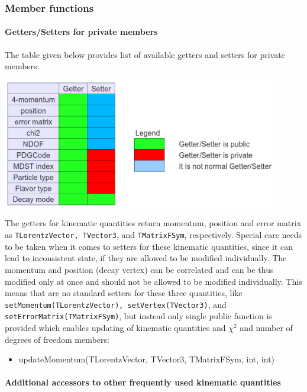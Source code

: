 \subsubsection{Member functions}

\paragraph{Getters/Setters for private members}

The table given below provides list of available getters and setters for private members:
\begin{center}
 \includegraphics[width=0.9\textwidth]{DataModel/figs/particleGetterSetter.png}
\end{center}
The getters for kinematic quantities return momentum, position and error matrix as {\tt TLorentzVector, TVector3}, and {\tt TMatrixFSym}, 
respectively. Special care needs to be taken when it comes to setters for these kinematic quantities, since it can lead to inconsistent 
state, if they are allowed to be modified individually. The momentum and position (decay vertex)
can be correlated and can be thus modified only at once and should not be allowed to be modified individually. 
This means that are no standard setters for these three quantities, like {\tt setMomentum(TLorentzVector), setVertex(TVector3)}, and 
{\tt setErrorMatrix(TMatrixFSym)}, but instead only single public function is provided which enables updating of kinematic quantities
and $\chi^2$ and number of degrees of freedom members:
\begin{itemize}
 \item {\bluett updateMomentum(TLorentzVector, TVector3, TMatrixFSym, int, int)}
\end{itemize}

\paragraph{Additional accessors to other frequently used kinematic quantities}

